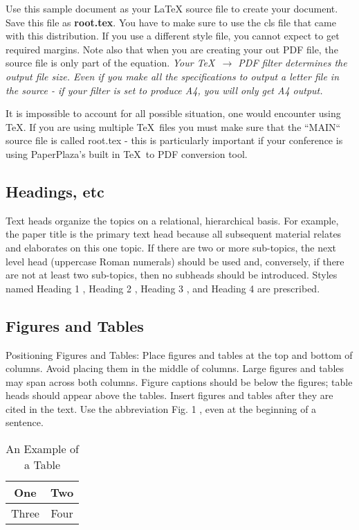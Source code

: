 \documentclass[a4paper, 10pt, conference]{ieeeconf}
\begin{document}
Use this sample document as your LaTeX source file to create your document. Save this file as {\bf root.tex}. You have to make sure to use the cls file that came with this distribution. If you use a different style file, you cannot expect to get required margins. Note also that when you are creating your out PDF file, the source file is only part of the equation. {\it Your \TeX\ $\rightarrow$ PDF filter determines the output file size. Even if you make all the specifications to output a letter file in the source - if your filter is set to produce A4, you will only get A4 output. }

It is impossible to account for all possible situation, one would encounter using \TeX. If you are using multiple \TeX\ files you must make sure that the ``MAIN`` source file is called root.tex - this is particularly important if your conference is using PaperPlaza's built in \TeX\ to PDF conversion tool.

\subsection{Headings, etc}

Text heads organize the topics on a relational, hierarchical basis. For example, the paper title is the primary text head because all subsequent material relates and elaborates on this one topic. If there are two or more sub-topics, the next level head (uppercase Roman numerals) should be used and, conversely, if there are not at least two sub-topics, then no subheads should be introduced. Styles named Heading 1 , Heading 2 , Heading 3 , and Heading 4 are prescribed.

\subsection{Figures and Tables}

Positioning Figures and Tables: Place figures and tables at the top and bottom of columns. Avoid placing them in the middle of columns. Large figures and tables may span across both columns. Figure captions should be below the figures; table heads should appear above the tables. Insert figures and tables after they are cited in the text. Use the abbreviation Fig. 1 , even at the beginning of a sentence.

\begin{table}[h]
\caption{An Example of a Table}
\label{table_example}
\begin{center}
\begin{tabular}{|c||c|}
\hline
One & Two\\
\hline
Three & Four\\
\hline
\end{tabular}
\end{center}
\end{table}
\end{document}
